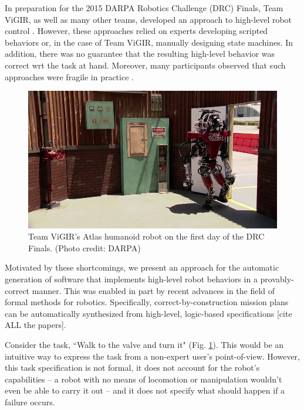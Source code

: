
In preparation for the 2015 DARPA Robotics Challenge (DRC) Finals, Team ViGIR, as well as many other teams, developed an approach to high-level robot control \cite{Philipp2013Bsc, Philipp2015MSc}.
However, these approaches relied on experts developing scripted behaviors or, in the case of Team ViGIR, manually designing state machines.
In addition, there was no guarantee that the resulting high-level behavior was correct \ac{wrt} the task at hand.
Moreover, many participants observed that such approaches were fragile in practice \cite{DRC-what-happened}.

\begin{figure}[t]
\centering
\includegraphics[width=0.99\columnwidth,clip]{./img/atlas_door_finals.png}
\caption{Team ViGIR's Atlas humanoid robot on the first day of the DRC Finals. (Photo credit: DARPA)
}
\label{Fig:AtlasDoorFinals}
\end{figure}

Motivated by these shortcomings, we present an approach for the automatic generation of software that implements high-level robot behaviors in a provably-correct manner.
This was enabled in part by recent advances in the field of formal methods for robotics.
Specifically, correct-by-construction mission plans can be automatically synthesized from high-level, logic-based specifications [cite ALL the papers].

\begin{myExample}\label{Ex:PickupObject}
	Consider the task, ``Walk to the valve and turn it" (Fig. \ref{Fig:AtlasDoorFinals}).
	This would be an intuitive way to express the task from a non-expert user's point-of-view.
	However, this task specification is not formal, it does not account for the robot's capabilities -- a robot with no means of locomotion or manipulation wouldn't even be able to carry it out -- and it does not specify what should happen if a failure occurs. %
\end{myExample}

